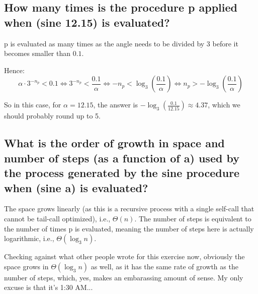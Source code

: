\documentclass{../../sicp}
\date{August 17, 2024}
\begin{document}
\maketitle

\subsection*{How many times is the procedure p applied when (sine 12.15) is evaluated?}
p is evaluated as many times as the angle needs to be divided by 3 before it becomes smaller than $0.1$.

Hence:
\[
	\alpha \cdot 3^{-n_p} < 0.1 \Leftrightarrow 3^{-n_p} < \frac{0.1}{\alpha} \Leftrightarrow -n_p < \log_3\left(\frac{0.1}{\alpha}\right) \Leftrightarrow n_p > -\log_3\left(\frac{0.1}{\alpha}\right)
\]

So in this case, for $\alpha = 12.15$, the answer is $-\log_3(\frac{0.1}{12.15}) \approx 4.37$, which we should probably round up to 5.

\subsection*{What is the order of growth in space and number of steps (as a function of a) used by the process generated by the sine procedure when (sine a) is evaluated?}

The space grows linearly (as this is a recursive process with a single self-call that cannot be tail-call optimized), i.e., $\Theta(n)$.
The number of steps is equivalent to the number of times p is evaluated, meaning the number of steps here is actually logarithmic, i.e., $\Theta(\log_3 n)$.

Checking against what other people wrote for this exercise now, obviously the space grows in $\Theta(\log_3 n)$ as well, as it has the same rate of growth as the number of steps, which, yes, makes an embarassing amount of sense.
My only excuse is that it's 1:30 AM...
\end{document}
